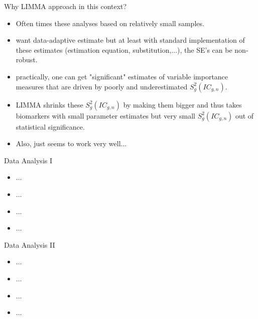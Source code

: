 \documentclass[12pt,t]{beamer}
\begin{document}
\begin{frame}[c]{Why LIMMA approach in this context?}

\begin{center}
\begin{itemize}
\item Often times these analyses based on relatively small samples.
\item want data-adaptive estimate but at least with standard implementation of these estimates (estimation equation, substitution,...), the SE's can be non-robust.
\item practically, one can get "significant" estimates of variable importance measures that are driven by poorly and underestimated $S^2_g(IC_{g,n})$. 
\item LIMMA shrinks these $S^2_g(IC_{g,n})$ by making them bigger and thus takes biomarkers with small parameter estimates but very small $S^2_g(IC_{g,n})$ out of statistical significance.
\item Also, just seems to work very well...
\end{itemize}
\end{center}


\end{frame}



\begin{frame}[c]{Data Analysis I}

\begin{center}
\begin{itemize}
  \itemsep12pt
  \item $\dots$
  \item $\dots$
  \item $\dots$
  \item $\dots$
\end{itemize}
\end{center}


\end{frame}



\begin{frame}[c]{Data Analysis II}

\begin{center}
\begin{itemize}
  \itemsep12pt
  \item $\dots$
  \item $\dots$
  \item $\dots$
  \item $\dots$
\end{itemize}
\end{center}


\end{frame}
\end{document}

